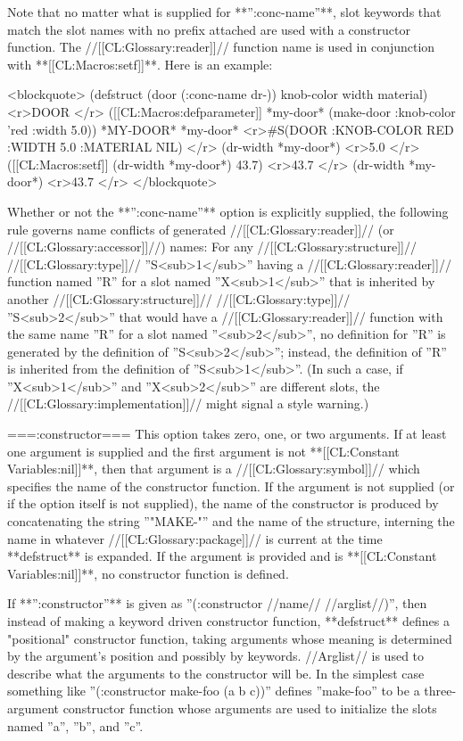 Note that no matter what is supplied for **'':conc-name''**, slot keywords that match the slot names with no prefix attached are used with a constructor function. The //[[CL:Glossary:reader]]// function name is used in conjunction with **[[CL:Macros:setf]]**. Here is an example:

<blockquote> 
(defstruct (door (:conc-name dr-)) 
  knob-color 
  width
  material) <r>DOOR </r>
([[CL:Macros:defparameter]] *my-door* (make-door :knob-color 'red :width 5.0)) *MY-DOOR*
*my-door* <r>#S(DOOR :KNOB-COLOR RED :WIDTH 5.0 :MATERIAL NIL) </r>
(dr-width *my-door*) <r>5.0 </r>
([[CL:Macros:setf]] (dr-width *my-door*) 43.7) <r>43.7 </r>
(dr-width *my-door*) <r>43.7 </r>
</blockquote>

Whether or not the **'':conc-name''** option is explicitly supplied, the following rule governs name conflicts of generated //[[CL:Glossary:reader]]// (or //[[CL:Glossary:accessor]]//) names: For any //[[CL:Glossary:structure]]// //[[CL:Glossary:type]]// ''S<sub>1</sub>'' having a //[[CL:Glossary:reader]]// function named ''R'' for a slot named ''X<sub>1</sub>'' that is inherited by another //[[CL:Glossary:structure]]// //[[CL:Glossary:type]]// ''S<sub>2</sub>'' that would have a //[[CL:Glossary:reader]]// function with the same name ''R'' for a slot named ''<sub>2</sub>'', no definition for ''R'' is generated by the definition of ''S<sub>2</sub>''; instead, the definition of ''R'' is inherited from the definition of ''S<sub>1</sub>''. (In such a case, if ''X<sub>1</sub>'' and ''X<sub>2</sub>'' are different slots, the //[[CL:Glossary:implementation]]// might signal a style warning.)

===:constructor===
This option takes zero, one, or two arguments. If at least one argument is supplied and the first argument is not **[[CL:Constant Variables:nil]]**, then that argument is a //[[CL:Glossary:symbol]]// which specifies the name of the constructor function. If the argument is not supplied (or if the option itself is not supplied), the name of the constructor is produced by concatenating the string ''"MAKE-"'' and the name of the structure, interning the name in whatever //[[CL:Glossary:package]]// is current at the time **defstruct** is expanded. If the argument is provided and is **[[CL:Constant Variables:nil]]**, no constructor function is defined.

If **'':constructor''** is given as ''(:constructor //name// //arglist//)'', then instead of making a keyword driven constructor function, **defstruct** defines a "positional" constructor function, taking arguments whose meaning is determined by the argument's position and possibly by keywords. //Arglist// is used to describe what the arguments to the constructor will be. In the simplest case something like ''(:constructor make-foo (a b c))'' defines ''make-foo'' to be a three-argument constructor function whose arguments are used to initialize the slots named ''a'', ''b'', and ''c''.

